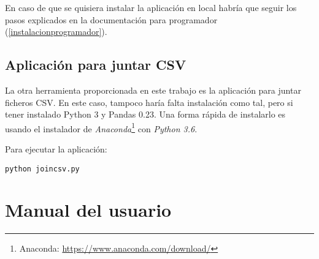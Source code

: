 En caso de que se quisiera instalar la aplicación en local habría que seguir los pasos explicados en la documentación para programador (\ref{instalacionprogramador}). 

\subsection{Aplicación para juntar CSV}

La otra herramienta proporcionada en este trabajo es la aplicación para juntar ficheros CSV. En este caso, tampoco haría falta instalación como tal, pero si tener instalado Python 3 y Pandas 0.23. Una forma rápida de instalarlo es usando el instalador de \textit{Anaconda}\footnote{Anaconda: \href{https://www.anaconda.com/download/}{https://www.anaconda.com/download/}} con \textit{Python 3.6}.

Para ejecutar la aplicación:

\begin{lstlisting}
python joincsv.py
\end{lstlisting}

\section{Manual del usuario}



